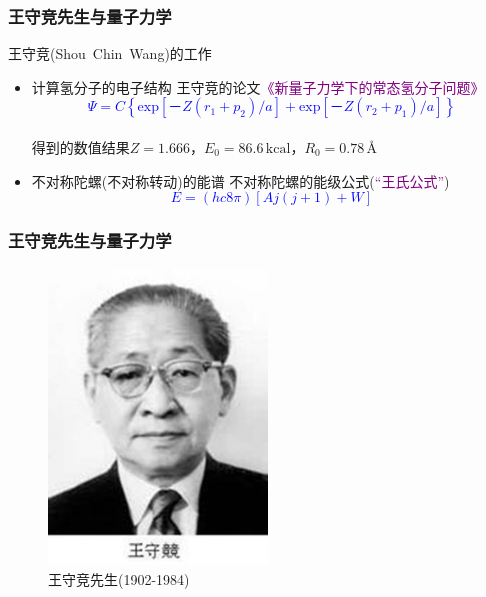 \frame
{
	\frametitle{王守竞先生与量子力学}
	王守竞(\textrm{Shou~Chin~Wang})的工作
	\begin{itemize}
		\item 计算氢分子的电子结构
			\vskip 2.5pt
			王守竞的论文\textcolor{purple}{《新量子力学下的常态氢分子问题》}%
	\textcolor{blue}{
	\begin{displaymath}
		\Psi=C\left\{ \mathrm{exp}[－Z(r_1+ p_2)/a]+\mathrm{exp}[－Z( r_2+ p_1)/a] \right\}
	\end{displaymath}}
	{\fontsize{7.2pt}{6.5pt}}\\
	得到的数值结果$Z=1.666$，$E_0=86.6\,\mathrm{kcal}$，$R_0=0.78$\,\textrm{\AA}
		\item 不对称陀螺(不对称转动)的能谱%
			\vskip 2.5pt
			不对称陀螺的能级公式(\textcolor{purple}{“王氏公式”})
	\textcolor{blue}{
	\begin{displaymath}
		E= (hc8\pi)[Aj(j+1)+W]
	\end{displaymath}}
	\end{itemize}
}

\frame
{
	\frametitle{王守竞先生与量子力学}
\begin{figure}[h!]
\centering
\vspace{-10.5pt}
\includegraphics[height=0.66\textwidth,width=0.52\textwidth,viewport=0 0 270 350,clip]{Figures/Wang_Shoujing.jpg}
\caption{王守竞先生(1902-1984)}
\label{Wang_Shoujing}
\end{figure}
}

